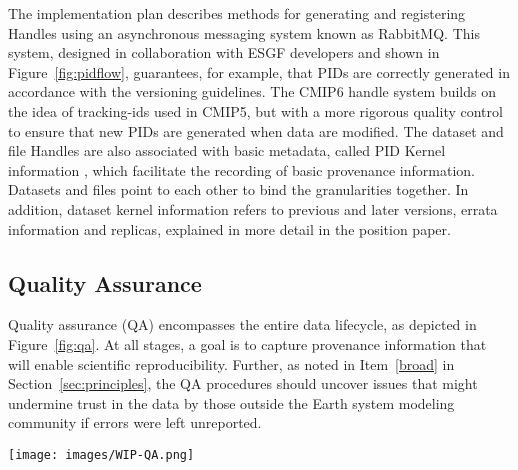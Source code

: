 \documentclass[gmd,manuscript]{copernicus}
\begin{document}
The implementation plan describes methods for generating and
registering Handles using an asynchronous messaging system known as
RabbitMQ. This system, designed in collaboration with ESGF developers
and shown in Figure~\ref{fig:pidflow}, guarantees, for example, that
PIDs are correctly generated in accordance with the versioning
guidelines. The CMIP6 handle system builds on the idea of tracking-ids
used in CMIP5, but with a more rigorous quality control to ensure that
new PIDs are generated when data are modified. The dataset and file
Handles are also associated with basic metadata, called PID Kernel
information \citep{ref:zhouetal2018}, which facilitate the recording
of basic provenance information. Datasets and files point to each
other to bind the granularities together. In addition, dataset kernel
information refers to previous and later versions, errata information
and replicas, explained in more detail in the position paper.

\subsection{Quality Assurance}
\label{sec:qa}

Quality assurance (QA) encompasses the entire data lifecycle, as
depicted in Figure~\ref{fig:qa}. At all stages, a goal is to capture
provenance information that will enable scientific reproducibility.
Further, as noted in Item~\ref{broad} in Section~\ref{sec:principles},
the QA procedures should uncover issues that might undermine trust in
the data by those outside the Earth system modeling community if
errors were left unreported.

\begin{figure*}
  \begin{center}
    \texttt{[image: images/WIP-QA.png]}
  \end{center}
  \caption{Schematic of the phases of quality assurance, with earlier
    stages in the hands of modeling centers (left), and more formal
    long-term data curation stages at right. Quality assurance is
    applied both to the data (D, above) as well as the metadata (M)
    describing the data. Figure drawn from the WIP's Quality Assurance
    position paper.}
  \label{fig:qa}
\end{figure*}
\end{document}
